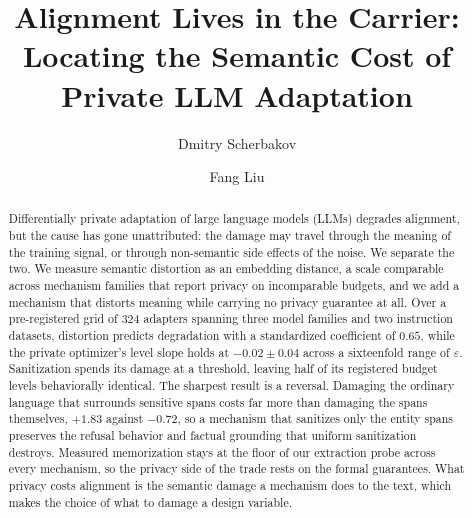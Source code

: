\documentclass{style}
\theoremstyle{definition}
\begin{document}
\title[Alignment Lives in the Carrier]{Alignment Lives in the Carrier: Locating the Semantic Cost of Private LLM Adaptation}

\author{Dmitry Scherbakov}
\address[Dmitry Scherbakov]{Faculty of Computational Mathematics and Cybernetics, Moscow State University, Russia}

\author{Fang Liu}
\address[Fang Liu]{Applied and Computational Mathematics and Statistics, University of Notre Dame, USA}

\date{}


\begin{abstract}
  Differentially private adaptation of large language models (LLMs) degrades alignment,
  but the cause has gone unattributed:
  the damage may travel through the meaning of the training signal,
  or through non-semantic side effects of the noise.
  We separate the two.
  We measure semantic distortion as an embedding distance,
  a scale comparable across mechanism families that report privacy on incomparable budgets,
  and we add a mechanism that distorts meaning while carrying no privacy guarantee at all.
  Over a pre-registered grid of $324$ adapters spanning three model families and two instruction datasets,
  distortion predicts degradation with a standardized coefficient of $0.65$,
  while the private optimizer's level slope holds at $-0.02 \pm 0.04$ across a sixteenfold range of $\varepsilon$.
  Sanitization spends its damage at a threshold,
  leaving half of its registered budget levels behaviorally identical.
  The sharpest result is a reversal.
  Damaging the ordinary language that surrounds sensitive spans costs far more than damaging the spans themselves,
  $+1.83$ against $-0.72$,
  so a mechanism that sanitizes only the entity spans preserves the refusal behavior and factual grounding that uniform sanitization destroys.
  Measured memorization stays at the floor of our extraction probe across every mechanism,
  so the privacy side of the trade rests on the formal guarantees.
  What privacy costs alignment is the semantic damage a mechanism does to the text,
  which makes the choice of what to damage a design variable.
\end{abstract}

\maketitle

\makeatletter
\@setaddresses
\global\let\addresses\@empty
\makeatother






\printbibliography





\appendix






\end{document}

